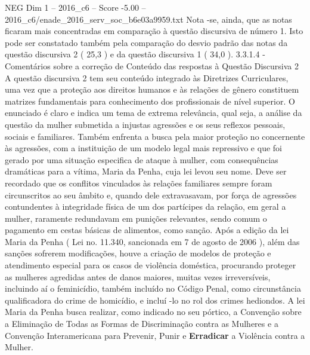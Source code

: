 \begin{textsample}{NEG Dim 1 – 2016\_c6 – Score -5.00 – 2016\_c6/enade\_2016\_serv\_soc\_b6e03a9959.txt}
Nota -se, ainda, que as notas ficaram mais concentradas em comparação à questão discursiva de número 1.
Isto pode ser constatado também pela comparação do desvio padrão das notas da questão discursiva 2 ( 25,3 ) e da questão discursiva 1 ( 34,0 ). 3.3.1.4 - Comentários sobre a correção de Conteúdo das respostas à Questão Discursiva 2 A questão discursiva 2 tem seu conteúdo integrado às Diretrizes Curriculares, uma vez que a proteção aos direitos humanos e às relações de gênero constituem matrizes fundamentais para conhecimento dos profissionais de nível superior.
O enunciado é claro e indica um tema de extrema relevância, qual seja, a análise da questão da mulher submetida a injustas agressões e os seus reflexos pessoais, sociais e familiares.
Também enfrenta a busca pela maior proteção no concernente às agressões, com a instituição de um modelo legal mais repressivo e que foi gerado por uma situação especifica de ataque à mulher, com consequências dramáticas para a vítima, Maria da Penha, cuja lei levou seu nome.
Deve ser recordado que os conflitos vinculados às relações familiares sempre foram circunscritos ao seu âmbito e, quando dele extravasavam, por força de agressões contundentes à integridade física de um dos partícipes da relação, em geral a mulher, raramente redundavam em punições relevantes, sendo comum o pagamento em cestas básicas de alimentos, como sanção.
Após a edição da lei Maria da Penha ( Lei no. 11.340, sancionada em 7 de agosto de 2006 ), além das sanções sofrerem modificações, houve a criação de modelos de proteção e atendimento especial para os casos de violência doméstica, procurando proteger as mulheres agredidas antes de danos maiores, muitas vezes irreversíveis, incluindo aí o feminicídio, também incluído no Código Penal, como circunstância qualificadora do crime de homicídio, e incluí -lo no rol dos crimes hediondos.
A lei Maria da Penha busca realizar, como indicado no seu pórtico, a Convenção sobre a Eliminação de Todas as Formas de Discriminação contra as Mulheres e a Convenção Interamericana para Prevenir, Punir e \textbf{Erradicar} a Violência contra a Mulher.

\end{textsample}
